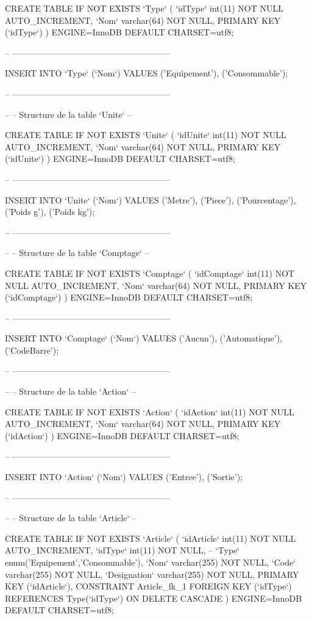 \begin{DoxyCode}
CREATE TABLE IF NOT EXISTS `Type` (
  `idType` int(11) NOT NULL AUTO\_INCREMENT,
  `Nom` varchar(64) NOT NULL,
  PRIMARY KEY (`idType`)
) ENGINE=InnoDB DEFAULT CHARSET=utf8;

-- --------------------------------------------------------

INSERT INTO `Type` (`Nom`) VALUES
('Equipement'),
('Consommable');

-- --------------------------------------------------------

--
-- Structure de la table `Unite`
--

CREATE TABLE IF NOT EXISTS `Unite` (
  `idUnite` int(11) NOT NULL AUTO\_INCREMENT,
  `Nom` varchar(64) NOT NULL,
  PRIMARY KEY (`idUnite`)
) ENGINE=InnoDB DEFAULT CHARSET=utf8;

-- --------------------------------------------------------

INSERT INTO `Unite` (`Nom`) VALUES
('Metre'),
('Piece'),
('Pourcentage'),
('Poids g'),
('Poids kg');

-- --------------------------------------------------------

--
-- Structure de la table `Comptage`
--

CREATE TABLE IF NOT EXISTS `Comptage` (
  `idComptage` int(11) NOT NULL AUTO\_INCREMENT,
  `Nom` varchar(64) NOT NULL,
  PRIMARY KEY (`idComptage`)
) ENGINE=InnoDB DEFAULT CHARSET=utf8;

-- --------------------------------------------------------

INSERT INTO `Comptage` (`Nom`) VALUES
('Aucun'),
('Automatique'),
('CodeBarre');

-- --------------------------------------------------------

--
-- Structure de la table `Action`
--

CREATE TABLE IF NOT EXISTS `Action` (
  `idAction` int(11) NOT NULL AUTO\_INCREMENT,
  `Nom` varchar(64) NOT NULL,
  PRIMARY KEY (`idAction`)
) ENGINE=InnoDB DEFAULT CHARSET=utf8;

-- --------------------------------------------------------

INSERT INTO `Action` (`Nom`) VALUES
('Entree'),
('Sortie');

-- --------------------------------------------------------

--
-- Structure de la table `Article`
--

CREATE TABLE IF NOT EXISTS `Article` (
  `idArticle` int(11) NOT NULL AUTO\_INCREMENT,
  `idType` int(11) NOT NULL,  
  --   `Type` enum('Equipement','Consommable'),
  `Nom` varchar(255) NOT NULL,
  `Code` varchar(255) NOT NULL,
  `Designation` varchar(255) NOT NULL,
  PRIMARY KEY (`idArticle`),
  CONSTRAINT Article\_fk\_1 FOREIGN KEY (`idType`) REFERENCES Type(`idType`) ON DELETE CASCADE
) ENGINE=InnoDB DEFAULT CHARSET=utf8;


\end{DoxyCode}
